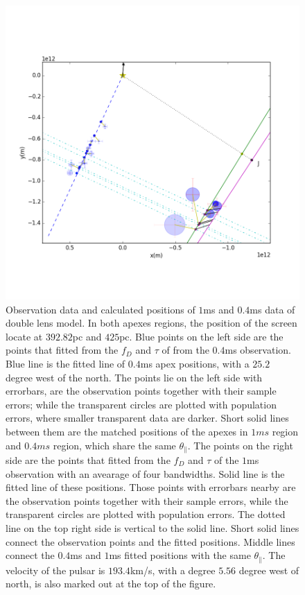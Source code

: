 \documentclass[useAMS,usenatbib]{mn2e}
\begin{document}
\begin{figure}
\centering
\includegraphics[width=1.0\textwidth, angle=0]{Double_lens_xy.png}
\caption{Observation data and calculated positions of $1$ms and $0.4$ms data of double lens model. In both apexes regions, the position of the screen locate at $392.82$pc and $425$pc. Blue points on the left side are the points that fitted from the $f_D$ and $\tau$ of from the $0.4$ms observation. Blue line is the fitted line of $0.4$ms apex positions, with a $25.2$ degree west of the north. The points lie on the left side with errorbars, are the observation points together with their sample errors; while the transparent circles are plotted with population errors, where smaller transparent data are darker. Short solid lines between them are the matched positions of the apexes in $1ms$ region and $0.4ms$ region, which share the same $\theta_{\parallel}$. The points on the right side are the points that fitted from the $f_D$ and $\tau$ of the $1$ms observation with an avearage of four bandwidths. Solid line is the fitted line of these positions. Those points with errorbars nearby are the observation points together with their sample errors, while the transparent circles are plotted with population errors. The dotted line on the top right side is vertical to the solid line. Short solid lines connect the observation points and the fitted positions. Middle lines connect the $0.4$ms and $1$ms fitted positions with the same $\theta_{\parallel}$. The velocity of the pulsar is $193.4$km/s, with a degree $5.56$ degree west of north, is also marked out at the top of the figure.  }
\label{Doublelens}
\end{figure}
\end{document}

